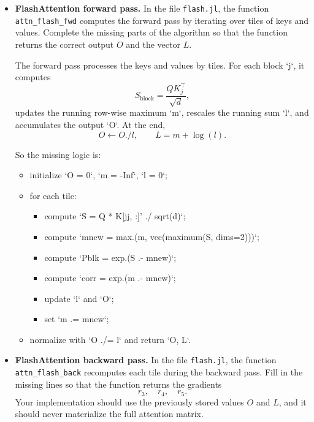 \documentclass{article}
\theoremstyle{definition}
\theoremstyle{remark}
\begin{document}
\begin{itemize}
    \item \textbf{FlashAttention forward pass.}
        In the file \texttt{flash.jl}, the function \texttt{attn\_flash\_fwd} computes the forward pass by iterating over tiles of keys and values.
        Complete the missing parts of the algorithm so that the function returns the correct output $O$ and the vector $L$.

        \begin{solution}
            The forward pass processes the keys and values by tiles. For each block `j`,
            it computes
            \[
            S_{\mathrm{block}}=\frac{QK_{j}^\top}{\sqrt d},
            \]
            updates the running row-wise maximum `m`, rescales the running sum `l`, and
            accumulates the output `O`. At the end,
            \[
            O\leftarrow O./l,\qquad L=m+\log(l).
            \]
        
            So the missing logic is:
            \begin{itemize}
                \item initialize `O = 0`, `m = -Inf`, `l = 0`;
                \item for each tile:
                \begin{itemize}
                    \item compute `S = Q * K[jj, :]' ./ sqrt(d)`;
                    \item compute `mnew = max.(m, vec(maximum(S, dims=2)))`;
                    \item compute `Pblk = exp.(S .- mnew)`;
                    \item compute `corr = exp.(m .- mnew)`;
                    \item update `l` and `O`;
                    \item set `m .= mnew`;
                \end{itemize}
                \item normalize with `O ./= l` and return `O, L`.
            \end{itemize}
        \end{solution}
    
    \item \textbf{FlashAttention backward pass.}
        In the file \texttt{flash.jl}, the function \texttt{attn\_flash\_back} recomputes each tile during the backward pass.
        Fill in the missing lines so that the function returns the gradients
        \[
        r_3,\quad r_4,\quad r_5.
        \]
        Your implementation should use the previously stored values $O$ and $L$, and it should never materialize the full attention matrix.


\end{itemize}
\end{document}
